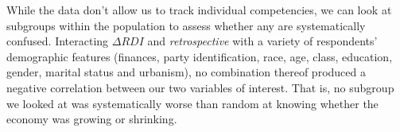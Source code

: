 \documentclass[11pt]{article}
\begin{document}
While the data don't allow us to track individual competencies, we can look at subgroups within the population to assess whether any are systematically confused.
Interacting $\Delta RDI$ and \emph{retrospective} with a variety of respondents'  demographic features (finances, party identification, race, age, class, education, gender, marital status and urbanism), no combination thereof  produced a negative correlation between our two variables of interest. That is, no subgroup we looked at was systematically worse than random at knowing whether the economy was growing or shrinking.



\end{document}
